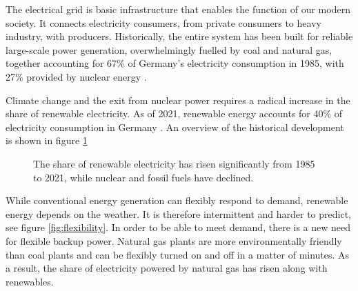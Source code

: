 The electrical grid is basic infrastructure that enables the function of our modern society.
It connects electricity consumers, from private consumers to heavy industry, with producers.
Historically, the entire system has been built for reliable large-scale power generation, overwhelmingly fuelled by coal and natural gas, together accounting for 67\% of Germany's electricity consumption in 1985, with 27\% provided by nuclear energy \cite{ritchie2022Energy}.

Climate change and the exit from nuclear power requires a radical increase in the share of renewable electricity. As of 2021, renewable energy accounts for 40\% of electricity consumption in Germany \cite{ritchie2022Energy}.
An overview of the historical development is shown in figure \ref{fig:electricity_mix}

\begin{figure}
    \centering
    \caption{The share of renewable electricity has risen significantly from 1985 to 2021, while nuclear and fossil fuels have declined.}
    \label{fig:electricity_mix}
\end{figure}

While conventional energy generation can flexibly respond to demand, renewable energy depends on the weather.
It is therefore intermittent and harder to predict, see figure \ref{fig:flexibility}. In order to be able to meet demand, there is a new need for flexible backup power.
Natural gas plants are more environmentally friendly than coal plants and can be flexibly turned on and off in a matter of minutes.
As a result, the share of electricity powered by natural gas has risen along with renewables.

